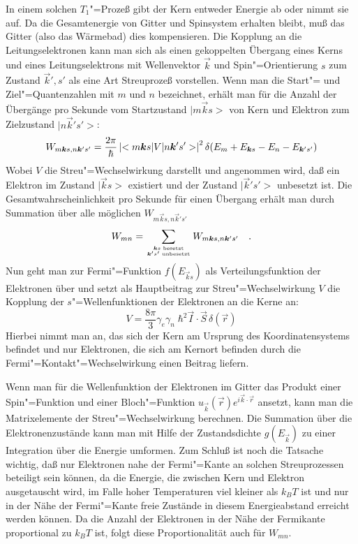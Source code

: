 In einem solchen $T_1$"=Prozeß gibt der Kern entweder Energie ab oder nimmt sie auf. Da die
Gesamtenergie von Gitter und Spinsystem erhalten bleibt, muß das Gitter (also das Wärmebad) dies
kompensieren. Die Kopplung an die Leitungselektronen kann man sich als einen gekoppelten Übergang
eines Kerns und eines Leitungselektrons mit Wellenvektor $\vec k$ und Spin"=Orientierung
$s$ zum Zustand $\vec k', s'$ als eine Art Streuprozeß vorstellen. Wenn man die Start"=
und Ziel"=Quantenzahlen mit $m$ und $n$ bezeichnet, erhält man für die Anzahl der Übergänge pro
Sekunde vom Startzustand $|m\vec ks>$ von Kern und Elektron zum Zielzustand $|n\vec k's'>$:
	\begin{equation}
		W_{m\vec ks, n\vec k's'}=
			\frac{2\pi}{\hbar}\abs{<m\vec ks|V|n\vec k's'>}^2\delta(E_m+E_{\vec ks}-E_n-E_{\vec k's'})
	\end{equation}
Wobei $V$ die Streu"=Wechselwirkung darstellt und angenommen wird, daß ein Elektron im Zustand
$|\vec ks>$ existiert und der Zustand $|\vec k's'>$ unbesetzt ist. Die Gesamtwahrscheinlichkeit
pro Sekunde für einen Übergang erhält man durch Summation über alle möglichen $W_{m\vec ks, n\vec
k's'}$
	\begin{equation}
		W_{mn}=\sum_{\bm k s \text{ besetzt}\atop\bm k's'\text{ unbesetzt}}W_{m\bm ks, n\bm k's'}\quad\text{.}
	\end{equation}
Nun geht man zur Fermi"=Funktion $f(E_{\vec ks})$ als Verteilungsfunktion der Elektronen über und
setzt als Hauptbeitrag zur Streu"=Wechselwirkung $V$ die Kopplung der $s$"=Wellenfunktionen der
Elektronen an die Kerne an:
	\begin{equation}
		V=\frac{8\pi}{3}\gamma_e\gamma_n\;\hbar^2\vec I\cdot\vec S\,\delta(\vec r)
	\end{equation}
Hierbei nimmt man an, das sich der Kern am Ursprung des Koordinatensystems befindet und nur
Elektronen, die sich am Kernort befinden durch die Fermi"=Kontakt"=Wechselwirkung einen
Beitrag liefern.

Wenn man für die Wellenfunktion der Elektronen im Gitter das Produkt einer Spin"=Funktion und einer
Bloch"=Funktion $u_{\vec k}(\vec r)e^{i\vec k\cdot\vec r}$ ansetzt, kann man die Matrixelemente der
Streu"=Wechselwirkung berechnen. Die Summation über die Elektronenzustände kann man mit Hilfe der
Zustandsdichte $g(E_{\vec k})$ zu einer Integration über die Energie umformen. Zum Schluß ist noch
die Tatsache wichtig, daß nur Elektronen nahe der Fermi"=Kante an solchen Streuprozessen beteiligt
sein können, da die Energie, die zwischen Kern und Elektron ausgetauscht wird, im Falle hoher
Temperaturen viel kleiner als $k_BT$ ist und nur in der Nähe der Fermi"=Kante freie Zustände in
diesem Energieabstand erreicht werden können. Da die Anzahl der Elektronen in der Nähe der
Fermikante proportional zu $k_BT$ ist, folgt diese Proportionalität auch für $W_{mn}$.

